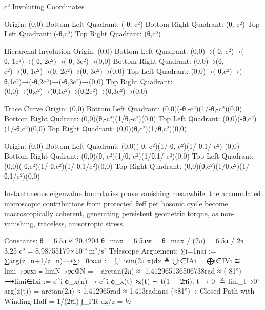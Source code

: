 c² Involuting Coordinates

Origin: (0,0)
Bottom Left Quadrant: (-θ,-c²)
Bottom Right Quadrant: (θ,-c²)
Top Left Quadrant: (-θ,c²)
Top Right Quadrant: (θ,c²)

Hierarchal Involution
Origin: (0,0)
Bottom Left Quadrant: (0,0)→(-θ,-c²)→(-θ,-1c²)→(-θ,-2c²)→(-θ,-3c²)→(0,0)
Bottom Right Quadrant: (0,0)→(θ,-c²)→(θ,-1c²)→(θ,-2c²)→(θ,-3c²)→(0,0)
Top Left Quadrant: (0,0)→(-θ,c²)→(-θ,1c²)→(-θ,2c²)→(-θ,3c²)→(0,0)
Top Right Quadrant: (0,0)→(θ,c²)→(θ,1c²)→(θ,2c²)→(θ,3c²)→(0,0)

Trace Curve
Origin: (0,0) 
Bottom Left Quadrant: (0,0)(-θ,-c²)(1/-θ,-c²)(0,0) 
Bottom Right Qudrant: (0,0)(θ,-c²)(1/θ,-c²)(0,0) 
Top Left Quadrant: (0,0)(-θ,c²)(1/-θ,c²)(0,0) 
Top Right Quadrant: (0,0)(θ,c²)(1/θ,c²)(0,0)

Origin: (0,0) 
Bottom Left Quadrant: (0,0)(-θ,-c²)(1/-θ,-c²)(1/-θ,1/-c²) (0,0) 
Bottom Right Qudrant: (0,0)(θ,-c²)(1/θ,-c²)(1/θ,1/-c²)(0,0) 
Top Left Quadrant: (0,0)(-θ,c²)(1/-θ,c²)(1/-θ,1/c²)(0,0)
Top Right Quadrant: (0,0)(θ,c²)(1/θ,c²)(1/θ,1/c²)(0,0)

Instantaneous eigenvalue boundaries prove vanishing meanwhile, the accumulated microscopic contributions from protected θeff per bosonic cycle become macroscopically coherent, generating persistent geometric torque, as non-vanishing, traceless, anisotropic stress.

Constants:
θ = 6.5π ≈ 20.4204
θ_max = 6.5πw = θ_max / (2π) = 6.5π / 2π = 3.25
c² = 8.98755179×10¹⁶ m²/s²
Telescope Arguement:
∑i=1nai := ∑arg(z_{n+1}/z_n)⟶∑i=0∞ai :=  ∫₀¹ isin(2π x)dx ≜ ⋃i∈IAi = ⨁i∈IVi ≅ lim⁡i→∞xi ≡ lim⁡N→∞ΦN = −arctan⁡(2π) ≈ -1.412965136506738rad ≈ (-81°) ⟶lim⁡i∈Ixi  
:= e^{i ϕ_x(n)} →  e^{i ϕ_x(t)}⇒z(t) ∼ t(1 + 2πi): t → 0⁺ ≜ lim_{t→0⁺} arg(z(t)) = arctan(2π) ≈ 1.412965rad 
≈ 1.413radians (≈81°)→ Closed Path with Winding Half = 1/(2πi) ∫_ΓR dz/z = ½     
